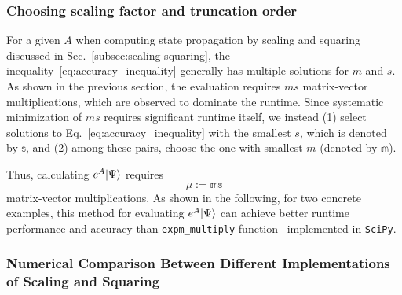 \subsubsection{Choosing scaling factor and truncation order}

For a given $A$ when computing state propagation by scaling and squaring discussed in Sec.~\ref{subsec:scaling-squaring}, the inequality~\eqref{eq:accuracy_inequality} generally has multiple solutions for $m$ and $s$. As shown in the previous section, the evaluation requires $ms$ matrix-vector multiplications, which are observed to dominate the runtime. Since systematic minimization of $ms$ requires significant runtime itself, we instead (1) select solutions to Eq.~\eqref{eq:accuracy_inequality} with the smallest $s$, which is denoted by $\mathbb{s}$, and (2) among these pairs, choose the one with smallest $m$ (denoted by $\mathbb{m}$). 
 
Thus, calculating $e^A|\Psi\rangle$ requires
\begin{equation}
\label{eq:mudefnition}
    \mu:=\mathbb{m}\mathbb{s}
\end{equation}
matrix-vector multiplications.
As shown in the following, for two concrete examples, this method for evaluating $e^A|\Psi\rangle$ can achieve better runtime performance and accuracy than \texttt{expm\_multiply} function~\cite{virtanen2020scipy,al2011computing} implemented in \texttt{SciPy}. 

\subsubsection{Numerical Comparison Between Different Implementations of Scaling and Squaring}
\label{subsubsec:ss-comparison}

